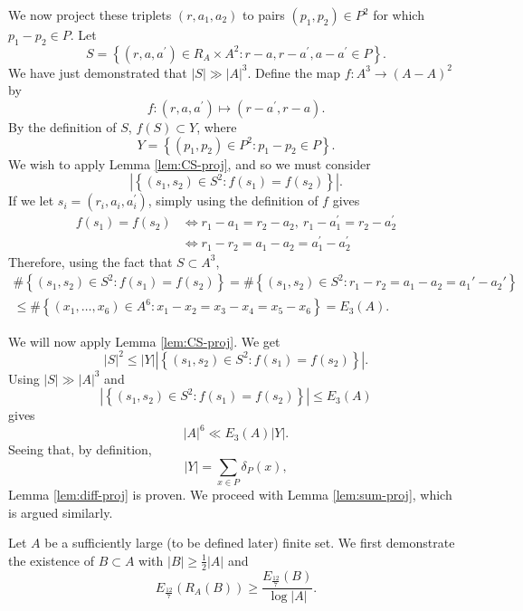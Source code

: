 \documentclass[reqno]{amsart}
\numberwithin{equation}{section}
\begin{document}
We now project these triplets \((r,a_1,a_2)\) to pairs \((p_1,p_2)\in P^{2}\) for which \(p_1-p_2 \in P\).
Let
\[
S=\left\{\left(r, a, a^{\prime}\right) \in R_{A}  \times A^2: r-a, r-a^{\prime}, a-a^{\prime} \in P  \right\}
.\]
We have just demonstrated that \(\left\lvert S \right\rvert \gg \left\lvert A \right\rvert ^{3} \). Define the map \(f : A ^{3} \to (A-A) ^{2}\) by
\[
f:\left(r, a, a^{\prime}\right) \mapsto\left(r-a^{\prime}, r-a\right)
.\]
By the definition of \(S\), \(f(S) \subset Y\), where
\[
Y=\left\{\left(p_1, p_2\right) \in P ^2: p_1-p_2 \in P \right\}
.\]
We wish to apply Lemma \ref{lem:CS-proj}, and so we must consider
\[
    \left\lvert \left\{ (s_1,s_2)\in S^{2} : f(s_1)= f(s_2) \right\}  \right\rvert 
.\]
If we let \(s_i=\left(r_i, a_i, a_i^{\prime}\right)\), simply using the definition of \(f\) gives
\begin{align*}
    f(s_1) = f(s_2)&  \iff r_1-a_1=r_2-a_2,~ r_1-a_1^{\prime}=r_2-a_2^{\prime}\\
    & \iff r_1-r_2=a_1-a_2=a_1^{\prime}-a_2^{\prime}
\end{align*}
Therefore, using the fact that \(S \subset A^{3}\),
\begin{align*}
\# \left\{ (s_1,s_2) \in S^{2}  : f(s_1) = f(s_2)\right\}  = \# \left\{ (s_1,s_2)\in S^{2} : r_1-r_2 = a_1-a_2 = a_1' - a_2' \right\}      \\
 \leq \# \left\{\left(x_1, \ldots, x_6\right) \in A^6: x_1-x_2=x_3-x_4=x_5-x_6\right\} =E_3(A).
\end{align*}

We will now apply Lemma \ref{lem:CS-proj}. We get
\[
|S|^2 \leq|Y|\left|\left\{\left(s_1, s_2\right) \in S^2: f\left(s_1\right)=f\left(s_2\right)\right\}\right|
.\]
Using \(\left\lvert S \right\rvert \gg \left\lvert A \right\rvert ^{3} \) and
\[
    \left|\left\{\left(s_1, s_2\right) \in S^2: f\left(s_1\right)=f\left(s_2\right)\right\}\right| \leq E_3(A)
\]
gives
\[
\left\lvert A \right\rvert ^{6} \ll E_3(A) \left\lvert Y \right\rvert
.\]
Seeing that, by definition,
\[
    \left\lvert Y \right\rvert  = \sum _{x \in P} \delta_{P} (x)
,\]
Lemma \ref{lem:diff-proj} is proven. We proceed with Lemma \ref{lem:sum-proj},
which is argued similarly.

Let \(A\) be a sufficiently large (to be defined later) finite set.
We first demonstrate the existence of \(B \subset A\) with \(\left\lvert B \right\rvert \geq \frac{1}{2} \left\lvert A \right\rvert \) and
\[
    E_{\frac{12}{7} } \left( R_{A} (B) \right) \geq \frac{E_{\frac{12}{7} } (B)}{\log \left\lvert A \right\rvert }
.\]
\end{document}
